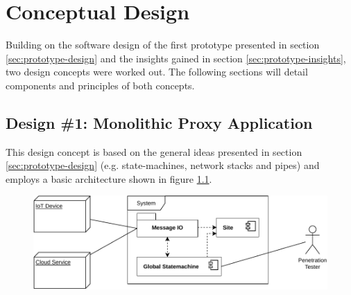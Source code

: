 \chapter{Conceptual Design}
\label{chap:conceptual-design}
Building on the software design of the first prototype presented in section \ref{sec:prototype-design} and the insights gained in section \ref{sec:prototype-insights}, two design concepts were worked out. The following sections will detail components and principles of both concepts.

\section{Design \#1: Monolithic Proxy Application}
\label{sec:design-1}
This design concept is based on the general ideas presented in section \ref{sec:prototype-design} (e.g. state-machines, network stacks and pipes) and employs a basic architecture shown in figure \ref{fig:component-view-1}.
\begin{figure}[h]
    \centering
    \includegraphics[width=12cm]{img/ch05/component-view-1.pdf}
    \label{fig:component-view-1}
\end{figure}
